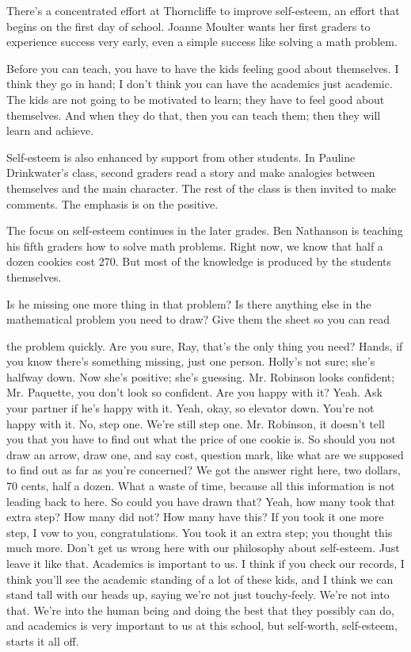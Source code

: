 There's a concentrated effort at Thorncliffe to improve self-esteem, an effort that begins on the first day of school. Joanne Moulter wants her first graders to experience success very early, even a simple success like solving a math problem.

Before you can teach, you have to have the kids feeling good about themselves. I think they go in hand; I don't think you can have the academics just academic. The kids are not going to be motivated to learn; they have to feel good about themselves. And when they do that, then you can teach them; then they will learn and achieve.

Self-esteem is also enhanced by support from other students. In Pauline Drinkwater's class, second graders read a story and make analogies between themselves and the main character. The rest of the class is then invited to make comments. The emphasis is on the positive.

The focus on self-esteem continues in the later grades. Ben Nathanson is teaching his fifth graders how to solve math problems. Right now, we know that half a dozen cookies cost 270. But most of the knowledge is produced by the students themselves.

Is he missing one more thing in that problem? Is there anything else in the mathematical problem you need to draw? Give them the sheet so you can read

 the problem quickly. Are you sure, Ray, that's the only thing you need? Hands, if you know there's something missing, just one person. Holly's not sure; she's halfway down. Now she's positive; she's guessing. Mr. Robinson looks confident; Mr. Paquette, you don't look so confident. Are you happy with it? Yeah. Ask your partner if he's happy with it. Yeah, okay, so elevator down. You're not happy with it. No, step one. We're still step one. Mr. Robinson, it doesn't tell you that you have to find out what the price of one cookie is. So should you not draw an arrow, draw one, and say cost, question mark, like what are we supposed to find out as far as you're concerned? We got the answer right here, two dollars, 70 cents, half a dozen. What a waste of time, because all this information is not leading back to here. So could you have drawn that? Yeah, how many took that extra step? How many did not? How many have this? If you took it one more step, I vow to you, congratulations. You took it an extra step; you thought this much more. Don't get us wrong here with our philosophy about self-esteem. Just leave it like that. Academics is important to us. I think if you check our records, I think you'll see the academic standing of a lot of these kids, and I think we can stand tall with our heads up, saying we're not just touchy-feely. We're not into that. We're into the human being and doing the best that they possibly can do, and academics is very important to us at this school, but self-worth, self-esteem, starts it all off.

